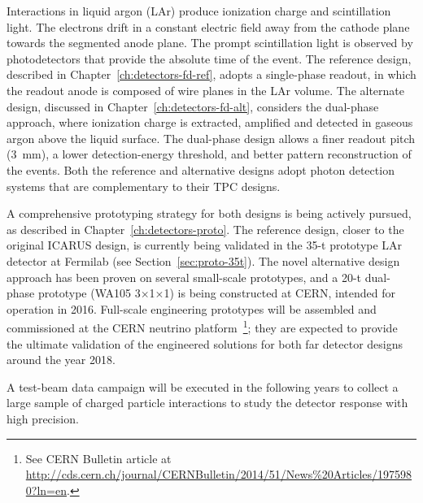 Interactions in liquid argon (LAr) produce ionization charge and
scintillation light.  The %
electrons drift in a constant electric field
away from the cathode plane towards the segmented anode plane.  The
prompt scintillation light is observed by photodetectors that provide
the absolute time of the event.  The reference design, described in
Chapter~\ref{ch:detectors-fd-ref}, adopts a single-phase readout,
in which the readout anode is composed of wire planes in the LAr
volume.  The alternate design, discussed in
Chapter~\ref{ch:detectors-fd-alt}, considers the dual-phase approach,
where ionization charge is extracted, amplified and detected in
gaseous argon above the liquid surface.  The dual-phase design 
allows a finer readout pitch (3~mm), a lower detection-energy threshold,
and better pattern reconstruction of the events.  
Both the reference and alternative designs adopt photon detection systems that are complementary
to their TPC designs. 

A comprehensive prototyping strategy for both designs is being actively
pursued, as described in Chapter~\ref{ch:detectors-proto}.  The
reference design, closer to the original ICARUS design, is currently
being validated in the 35-t prototype LAr detector at Fermilab (see Section~\ref{sec:proto-35t}).  The
novel alternative design approach has been proven on
several small-scale prototypes, and a 20-t dual-phase
prototype (WA105 3$\times$1$\times$1) is being constructed at CERN, intended for
operation in 2016.  Full-scale engineering prototypes will be
assembled and commissioned at the CERN neutrino platform~\footnote{See CERN Bulletin article at \href{http://cds.cern.ch/journal/CERNBulletin/2014/51/News\%20Articles/1975980?ln=en}{http://cds.cern.ch/journal/CERNBulletin/2014/51/News\%20Articles/1975980?ln=en}.}; they are 
expected to provide the ultimate validation of the engineered solutions
for both far detector designs around the year 2018. 

A test-beam data
campaign will be executed in the following years to collect a large
sample of charged particle interactions to study the detector response
with high precision.  %

